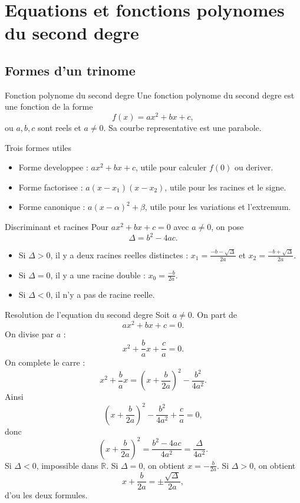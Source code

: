 \documentclass[11pt,a4paper]{article}
\newcommand{\R}{\mathbb{R}}
\begin{document}
\section{Equations et fonctions polynomes du second degre}

\subsection{Formes d'un trinome}
\begin{boitecours}{Fonction polynome du second degre}
Une fonction polynome du second degre est une fonction de la forme
\[
f(x)=ax^2+bx+c,
\]
ou $a,b,c$ sont reels et $a\ne0$. Sa courbe representative est une parabole.
\end{boitecours}

\begin{boitecours}{Trois formes utiles}
\begin{itemize}
  \item Forme developpee : $ax^2+bx+c$, utile pour calculer $f(0)$ ou deriver.
  \item Forme factorisee : $a(x-x_1)(x-x_2)$, utile pour les racines et le signe.
  \item Forme canonique : $a(x-\alpha)^2+\beta$, utile pour les variations et l'extremum.
\end{itemize}
\end{boitecours}

\begin{boitecours}{Discriminant et racines}
Pour $ax^2+bx+c=0$ avec $a\ne0$, on pose
\[
\Delta=b^2-4ac.
\]
\begin{itemize}
  \item Si $\Delta>0$, il y a deux racines reelles distinctes : $x_1=\frac{-b-\sqrt\Delta}{2a}$ et $x_2=\frac{-b+\sqrt\Delta}{2a}$.
  \item Si $\Delta=0$, il y a une racine double : $x_0=\frac{-b}{2a}$.
  \item Si $\Delta<0$, il n'y a pas de racine reelle.
\end{itemize}
\end{boitecours}

\begin{boitepreuve}{Resolution de l'equation du second degre}
Soit $a\ne0$. On part de
\[
ax^2+bx+c=0.
\]
On divise par $a$ :
\[
x^2+\frac ba x+\frac ca=0.
\]
On complete le carre :
\[
x^2+\frac ba x=\left(x+\frac b{2a}\right)^2-\frac{b^2}{4a^2}.
\]
Ainsi
\[
\left(x+\frac b{2a}\right)^2-\frac{b^2}{4a^2}+\frac ca=0,
\]
donc
\[
\left(x+\frac b{2a}\right)^2=\frac{b^2-4ac}{4a^2}=\frac{\Delta}{4a^2}.
\]
Si $\Delta<0$, impossible dans $\R$. Si $\Delta=0$, on obtient $x=-\frac b{2a}$. Si $\Delta>0$, on obtient
\[
x+\frac b{2a}=\pm\frac{\sqrt\Delta}{2a},
\]
d'ou les deux formules.
\end{boitepreuve}
\end{document}

